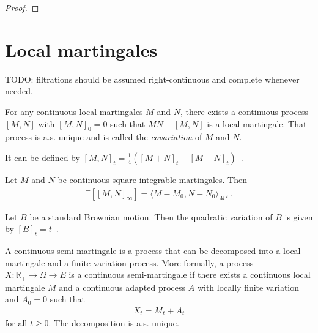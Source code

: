\begin{proof}

\end{proof}


\section{Local martingales}

TODO: filtrations should be assumed right-continuous and complete whenever needed.








\begin{definition}[Covariation]\label{def:covariation}
For any continuous local martingales $M$ and $N$, there exists a continuous process $[M,N]$ with $[M,N]_0 = 0$ such that $MN - [M,N]$ is a local martingale. That process is a.s. unique and is called the \emph{covariation} of $M$ and $N$.

It can be defined by $[M, N]_t = \frac{1}{4}\left([M+N]_t - [M-N]_t \right)$~.
\end{definition}


\begin{lemma}\label{lem:covariation_eq_inner}
Let $M$ and $N$ be continuous square integrable martingales. Then
\begin{align*}
  \mathbb{E}\left[[M,N]_\infty\right] = \langle M - M_0, N - N_0 \rangle_{\mathcal{M}^2}
  \: .
\end{align*}
\end{lemma}




\begin{lemma}\label{lem:quadraticVariation_brownian}
Let $B$ be a standard Brownian motion. Then the quadratic variation of $B$ is given by $[B]_t = t$~.
\end{lemma}




\begin{definition}\label{def:continuousSemiMartingale}
A continuous semi-martingale is a process that can be decomposed into a local martingale and a finite variation process.
More formally, a process $X : \mathbb{R}_+ \to \Omega \to E$ is a continuous semi-martingale if there exists a continuous local martingale $M$ and a continuous adapted process $A$ with locally finite variation and $A_0 = 0$ such that
\begin{align*}
  X_t = M_t + A_t
\end{align*}
for all $t \ge 0$.
The decomposition is a.s. unique.
\end{definition}


